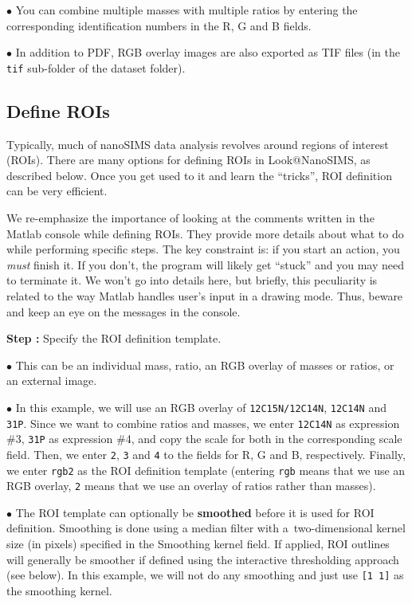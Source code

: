 \documentclass[a4paper, 11pt]{article}
\newcommand{\ttt}[1]{\texttt{#1}}
\newcommand{\lans}[1]{{\color{magenta}#1}}
\newcommand{\lanstf}[1]{{\color{cyan}#1}}
\newcounter{step}
\newcommand\s{\addtocounter{step}{1}\noindent\textbf{Step \thestep:}{ }}
\newcommand\bul{\noindent$\bullet${ }}
\newcommand\bb[1]{\textbf{#1}}
\begin{document}
\bul You can combine multiple masses with multiple ratios by entering the corresponding identification numbers in the R, G and B fields.

\bul In addition to PDF, RGB overlay images are also exported as TIF files (in the \ttt{tif} sub-folder of the dataset folder).


\subsection{Define ROIs}
\setcounter{step}{0}

Typically, much of nanoSIMS data analysis revolves around regions of interest (ROIs). There are many options for defining ROIs in Look@NanoSIMS, as described below. Once you get used to it and learn the ``tricks'', ROI definition can be very efficient. 

We re-emphasize the importance of looking at the comments written in the Matlab console while defining ROIs. They provide more details about what to do while performing specific steps. The key constraint is: if you start an action, you \emph{must} finish it. If you don't, the program will likely get ``stuck'' and you may need to terminate it. We won't go into details here, but briefly, this peculiarity is related to the way Matlab handles user's input in a drawing mode. Thus, beware and keep an eye on the messages in the console.

\s Specify the \lanstf{ROI definition template}. 

\bul This can be an individual mass, ratio, an RGB overlay of masses or ratios, or an external image.

\bul In this example, we will use an RGB overlay of \ttt{12C15N/12C14N}, \ttt{12C14N} and \ttt{31P}. Since we want to combine ratios and masses, we enter \ttt{12C14N} as expression \#3, \ttt{31P} as expression \#4, and copy the scale for both in the corresponding \lanstf{scale} field. Then, we enter \ttt{2}, \ttt{3} and \ttt{4} to the fields for \lanstf{R}, \lanstf{G} and \lanstf{B}, respectively. Finally, we enter \ttt{rgb2} as the \lanstf{ROI definition template} (entering \ttt{rgb} means that we use an RGB overlay, \ttt{2} means that we use an overlay of ratios rather than masses).

\bul The ROI template can optionally be \bb{smoothed} before it is used for ROI definition. Smoothing is done using a median filter with a~two-dimensional kernel size (in pixels) specified in the \lanstf{Smoothing kernel} field. If applied, ROI outlines will generally be smoother if defined using the \lans{interactive thresholding} approach (see below). In this example, we will not do any smoothing and just use \ttt{[1 1]} as the smoothing kernel.
\end{document}
